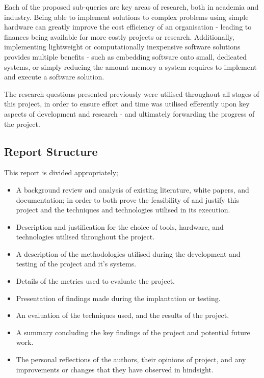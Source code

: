 Each of the proposed sub-queries are key areas of research, both in academia
and industry.
Being able to implement solutions to complex problems using simple hardware
can greatly improve the cost efficiency of an organisation - leading to
finances being available for more costly projects or research. 
Additionally, implementing lightweight or computationally inexpensive software
solutions provides multiple benefits - such as embedding software onto small,
dedicated systems, or simply reducing the amount memory a system requires to
implement and execute a software solution. 

The research questions presented previously were utilised throughout all
stages of this project, in order to ensure effort and time was utilised
efferently upon key aspects of development and research - and ultimately
forwarding the progress of the project.

\subsection{Report Structure}
This report is divided appropriately;

\begin{itemize}

\item A background review and analysis of existing literature, white papers, and
documentation; in order to both prove the feasibility of and justify this
project and the techniques and technologies utilised in its execution.

\item Description and justification for the choice of tools, hardware, and
technologies utilised throughout the project.

\item A description of the methodologies utilised during the
development and testing of the project and it's systems.

\item Details of the metrics used to evaluate the project.

\item Presentation of findings made during the implantation or testing.

\item An evaluation of the techniques used, and the results of the project.

\item A summary concluding the key findings of the project and potential future
work.

\item The personal reflections of the authors, their opinions of project, and
any improvements or changes that they have observed in hindsight.

\end{itemize}
